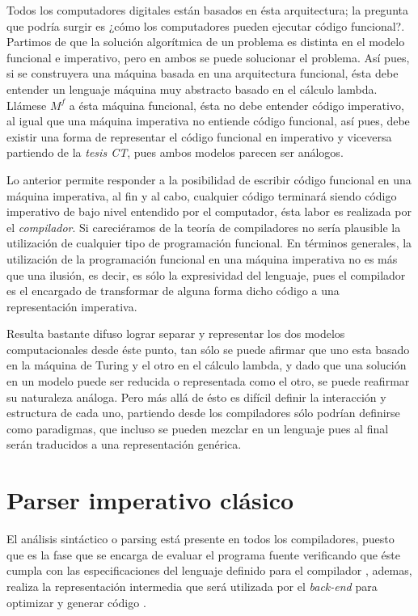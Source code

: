 	Todos los computadores digitales están basados en ésta arquitectura; la pregunta que podría surgir es ¿cómo los computadores pueden ejecutar código funcional?. Partimos de que la solución algorítmica de un problema es distinta en el modelo funcional e imperativo, pero en ambos se puede solucionar el problema. Así pues, si se construyera una máquina basada en una arquitectura funcional, ésta debe entender un lenguaje máquina muy abstracto basado en el cálculo lambda. Llámese $M^f$ a ésta máquina funcional, ésta no debe entender código imperativo, al igual que una máquina imperativa no entiende código funcional, así pues, debe existir una forma de representar el código funcional en imperativo y viceversa partiendo de la \emph{tesis CT}, pues ambos modelos parecen ser análogos.
	
	Lo anterior permite responder a la posibilidad de escribir código funcional en una máquina imperativa, al fin y al cabo, cualquier código terminará siendo código imperativo de bajo nivel entendido por el computador, ésta labor es realizada por el \emph{compilador}. Si careciéramos de la teoría de compiladores no sería plausible la utilización de cualquier tipo de programación funcional. En términos generales, la utilización de la programación funcional en una máquina imperativa no es más que una ilusión, es decir, es sólo la expresividad del lenguaje, pues el compilador es el encargado de transformar de alguna forma dicho código a una representación imperativa.
	
	Resulta bastante difuso lograr separar y representar los dos modelos computacionales desde éste punto, tan sólo se puede afirmar que uno esta basado en la máquina de Turing y el otro en el cálculo lambda, y dado que una solución en un modelo puede ser reducida o representada como el otro, se puede reafirmar su naturaleza análoga. Pero más allá de ésto es difícil definir la interacción y estructura de cada uno, partiendo desde los compiladores sólo podrían definirse como paradigmas, que incluso se pueden mezclar en un lenguaje pues al final serán traducidos a una representación genérica. 
	
	
\section{Parser imperativo clásico}
El análisis sintáctico o parsing está presente en todos los compiladores, puesto que es la fase que se encarga de evaluar el programa fuente verificando que éste cumpla con las especificaciones del lenguaje definido para el compilador \cite{MarioZ}, ademas, realiza la representación intermedia que será utilizada por el \emph{back-end} para optimizar y generar código \cite{Dragon}.

